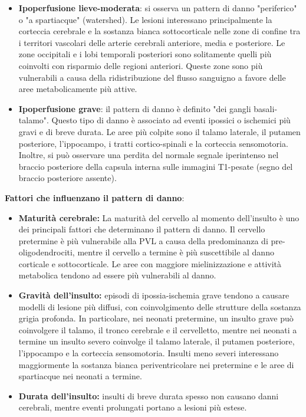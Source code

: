 \begin{itemize}
	\tightlist
	\item
	\textbf{Ipoperfusione lieve-moderata}: si osserva un pattern di danno "periferico" o "a spartiacque" (watershed). Le lesioni interessano principalmente la corteccia cerebrale e la sostanza bianca sottocorticale nelle zone di confine tra i territori vascolari delle arterie cerebrali anteriore, media e posteriore. Le zone occipitali e i lobi temporali posteriori sono solitamente quelli più coinvolti con risparmio delle regioni anteriori. Queste zone sono più vulnerabili a causa della ridistribuzione del flusso sanguigno a favore delle aree metabolicamente più attive.
	\item
	\textbf{Ipoperfusione grave}: il pattern di danno è definito "dei gangli basali-talamo". Questo tipo di danno è associato ad eventi ipossici o ischemici più gravi e di breve durata. Le aree più colpite sono il talamo laterale, il putamen posteriore, l'ippocampo, i tratti cortico-spinali e la corteccia sensomotoria. Inoltre, si può osservare una perdita del normale segnale iperintenso nel braccio posteriore della capsula interna sulle immagini T1-pesate (segno del braccio posteriore assente).
\end{itemize}

\textbf{Fattori che influenzano il pattern di danno}:

\begin{itemize}
	\tightlist
	\item
	\textbf{Maturità cerebrale:} La maturità del cervello al momento dell'insulto è uno dei principali fattori che determinano il pattern di danno. Il cervello pretermine è più vulnerabile alla PVL a causa della predominanza di pre-oligodendrociti, mentre il cervello a termine è più suscettibile al danno corticale e sottocorticale. Le aree con maggiore mielinizzazione e attività metabolica tendono ad essere più vulnerabili al danno.
	\item
	\textbf{Gravità dell'insulto:} episodi di ipossia-ischemia grave tendono a causare modelli di lesione più diffusi, con coinvolgimento delle strutture della sostanza grigia profonda. In particolare, nei neonati pretermine, un insulto grave può coinvolgere il talamo, il tronco cerebrale e il cervelletto, mentre nei neonati a termine un insulto severo coinvolge il talamo laterale, il putamen posteriore, l'ippocampo e la corteccia sensomotoria. Insulti meno severi interessano maggiormente la sostanza bianca periventricolare nei pretermine e le aree di spartiacque nei neonati a termine.
	\item
	\textbf{Durata dell'insulto:} insulti di breve durata spesso non causano danni cerebrali, mentre eventi prolungati portano a lesioni più estese.
\end{itemize}

